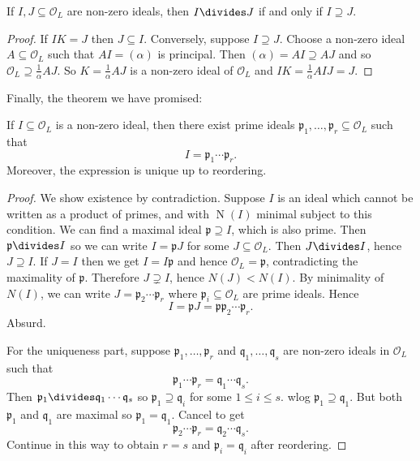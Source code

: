 \documentclass[a4paper]{article}
\renewcommand*{\O}{\mathcal{O}}
\DeclareMathOperator{\n}{N}
\begin{document}
\begin{corollary}
  If \(I, J \subseteq \O_L\) are non-zero ideals, then \(I \divides J\) if and only if \(I \supseteq J\).
\end{corollary}

\begin{proof}
  If \(IK = J\) then \(J \subseteq I\). Conversely, suppose \(I \supseteq J\). Choose a non-zero ideal \(A \subseteq \O_L\) such that \(AI = (\alpha)\) is principal. Then \((\alpha) = AI \supseteq AJ\) and so \(\O_L \supseteq \frac{1}{\alpha}AJ\). So \(K = \frac{1}{\alpha}AJ\) is a non-zero ideal of \(\O_L\) and \(IK = \frac{1}{\alpha}AIJ = J\).
\end{proof}

Finally, the theorem we have promised:

\begin{theorem}
  If \(I \subseteq \O_L\) is a non-zero ideal, then there exist prime ideals \(\mathfrak{p}_1, \dots, \mathfrak{p}_r \subseteq \O_L\) such that
  \[
    I = \mathfrak{p}_1\cdots \mathfrak{p}_r.
  \]
  Moreover, the expression is unique up to reordering.
\end{theorem}

\begin{proof}
  We show existence by contradiction. Suppose \(I\) is an ideal which cannot be written as a product of primes, and with \(\n(I)\) minimal subject to this condition. We can find a maximal ideal \(\mathfrak{p} \supseteq I\), which is also prime. Then \(\mathfrak{p} \divides I\) so we can write \(I = \mathfrak{p}J\) for some \(J \subseteq \O_L\). Then \(J \divides I\), hence \(J \supseteq I\). If \(J = I\) then we get \(I = I\mathfrak{p}\) and hence \(\O_L = \mathfrak{p}\), contradicting the maximality of \(\mathfrak{p}\). Therefore \(J \supsetneq I\), hence \(N(J) < N(I)\). By minimality of \(N(I)\), we can write \(J = \mathfrak{p}_2 \cdots \mathfrak{p}_r\) where \(\mathfrak{p}_i \subseteq \O_L\) are prime ideals. Hence
  \[
    I = \mathfrak{p}J = \mathfrak{p}\mathfrak{p}_2 \cdots \mathfrak{p}_r.
  \]
  Absurd.

  For the uniqueness part, suppose \(\mathfrak{p}_1, \dots, \mathfrak{p}_r\) and \(\mathfrak{q}_1, \dots, \mathfrak{q}_s\) are non-zero ideals in \(\O_L\) such that
  \[
    \mathfrak{p}_1 \cdots \mathfrak{p}_r = \mathfrak{q}_1 \cdots \mathfrak{q}_s.
  \]
  Then \(\mathfrak{p}_1 \divides \mathfrak{q}_1 \cdots \mathfrak{q}_s\) so \(\mathfrak{p}_1 \supseteq \mathfrak{q}_i\) for some \(1 \leq i \leq s\). wlog \(\mathfrak{p}_1 \supseteq \mathfrak{q}_1\). But both \(\mathfrak{p}_1\) and \(\mathfrak{q}_1\) are maximal so \(\mathfrak{p}_1 = \mathfrak{q}_1\). Cancel to get
  \[
    \mathfrak{p}_2\cdots \mathfrak{p}_r = \mathfrak{q}_2 \cdots \mathfrak{q}_s.
  \]
  Continue in this way to obtain \(r = s\) and \(\mathfrak{p}_i = \mathfrak{q}_i\) after reordering.
\end{proof}
\end{document}
